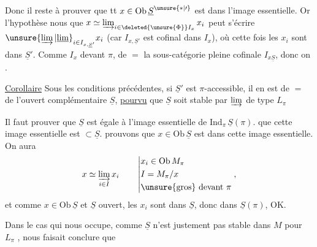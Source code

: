 Donc il reste à prouver que tt $x\in\mathrm{Ob}\,\underline S^{\unsure{*|\prime}}$
est dans l'image essentielle. Or l'hypothèse nous
 que
$x\simeq\varinjlim_{i\in\deleted{\unsure{\Phi}}I_x}x_i$ peut s'écrire
$\unsure{\varinjlim|\underline{\lim}}_{i\in I_{x,\underline S'}}x_i$
(car $I_{x,\underline S'}$ est cofinal dans $I_x$), où cette fois les
$x_i$ sont dans $\underline S'$. Comme $I_x$  devant
$\pi$, de $=$ la sous-catégorie pleine cofinale $I_{x\underline S}$,
donc on .

\uline{Corollaire}  Sous les conditions
précédentes, si $\underline S'$ est $\pi$-accessible, il en est de
$=$ de l'ouvert complémentaire $\underline S$, \uline{pourvu} que
$\underline S$ soit stable  par $\varinjlim$ de type
$L_\pi$\margin{!}

Il faut prouver que $\underline S$ est égale à l'image essentielle
de $\mathrm{Ind}_{\pi}\,\underline S(\pi)$.
 
que cette image essentielle est $\subset\underline S$.
prouvons que  
$x\in\mathrm{Ob}\,\underline S$ est dans cette image essentielle.
On aura
\[
 x\simeq\varinjlim_{i\in I}x_i\qquad
 \left|\begin{aligned}&x_i\in\mathrm{Ob}\,M_\pi\\
 &I=M_\pi/x\\&\text{\unsure{gros} devant }\pi\end{aligned}\right.,
\]
et comme $x\in\mathrm{Ob}\,\underline S$ et $\underline S$ ouvert,
les $x_i$  sont dans
$\underline S$, donc dans $\underline S(\pi)$, OK.

 Dans le cas qui nous occupe,
 comme $\underline S$ n'est
justement pas stable dans $M$ pour $L_\pi$
,   nous faisait conclure que

